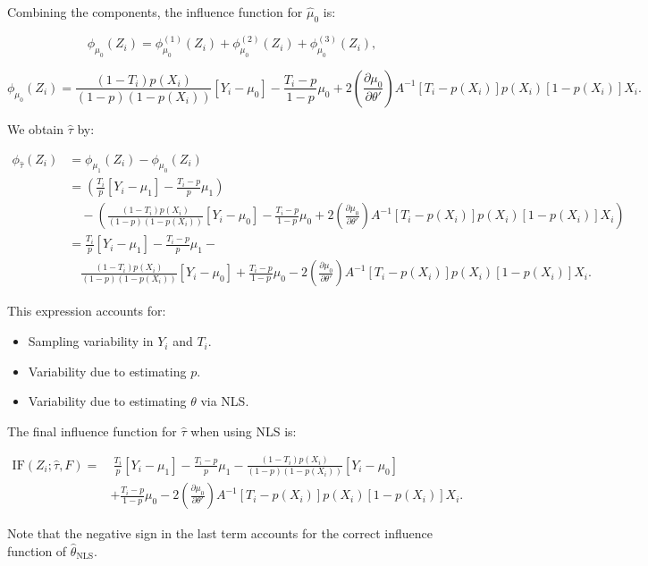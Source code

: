 \documentclass{article}
\begin{document}
Combining the components, the influence function for \(\hat{\mu}_0\) is:

\[
\phi_{\mu_0}(Z_i) = \phi_{\mu_0}^{(1)}(Z_i) + \phi_{\mu_0}^{(2)}(Z_i) + \phi_{\mu_0}^{(3)}(Z_i),
\]

\[
\phi_{\mu_0}(Z_i) = \frac{(1 - T_i) p(X_i)}{(1 - p)(1 - p(X_i))} [Y_i - \mu_0] - \frac{T_i - p}{1 - p} \mu_0 + 2 \left( \frac{\partial \mu_0}{\partial \theta'} \right) A^{-1} [T_i - p(X_i)] p(X_i) [1 - p(X_i)] X_i.
\]

We obtain \(\hat{\tau}\) by:

\begin{align*}
\phi_{\hat{\tau}}(Z_i) &= \phi_{\mu_1}(Z_i) - \phi_{\mu_0}(Z_i) \\
&= \left( \frac{T_i}{p} [Y_i - \mu_1] - \frac{T_i - p}{p} \mu_1 \right) \\ & \quad - \left( \frac{(1 - T_i) p(X_i)}{(1 - p)(1 - p(X_i))} [Y_i - \mu_0] - \frac{T_i - p}{1 - p} \mu_0 + 2 \left( \frac{\partial \mu_0}{\partial \theta'} \right) A^{-1} [T_i - p(X_i)] p(X_i) [1 - p(X_i)] X_i \right) \\
&= \frac{T_i}{p} [Y_i - \mu_1] - \frac{T_i - p}{p} \mu_1 - \\ & \quad \frac{(1 - T_i) p(X_i)}{(1 - p)(1 - p(X_i))} [Y_i - \mu_0] + \frac{T_i - p}{1 - p} \mu_0 - 2 \left( \frac{\partial \mu_0}{\partial \theta'} \right) A^{-1} [T_i - p(X_i)] p(X_i) [1 - p(X_i)] X_i.
\end{align*}

This expression accounts for:
\begin{itemize}
    \item Sampling variability in \(Y_i\) and \(T_i\).
    \item Variability due to estimating \(p\).
    \item Variability due to estimating \(\theta\) via NLS.
\end{itemize}

The final influence function for \(\hat{\tau}\) when using NLS is:

\begin{align*}
  \text{IF}(Z_i; \hat{\tau}, F) =& \ \frac{T_i}{p} [Y_i - \mu_1] - \frac{T_i - p}{p} \mu_1 - \frac{(1 - T_i) p(X_i)}{(1 - p)(1 - p(X_i))} [Y_i - \mu_0] \\ & + \frac{T_i - p}{1 - p} \mu_0 - 2 \left( \frac{\partial \mu_0}{\partial \theta'} \right) A^{-1} [T_i - p(X_i)] p(X_i) [1 - p(X_i)] X_i.  
\end{align*}

Note that the negative sign in the last term accounts for the correct influence function of \(\hat{\theta}_{\text{NLS}}\).
\end{document}
